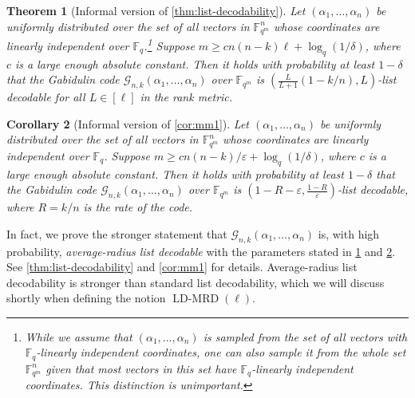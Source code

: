 \documentclass[11pt]{article}
\theoremstyle{plain}
\newtheorem{thm}{Theorem}[section]
\newtheorem{cor}[thm]{Corollary}
\theoremstyle{definition}
\theoremstyle{remark}
\newcommand{\F}{\mathbb{F}}
\newcommand{\eps}{\varepsilon}
\renewcommand{\epsilon}{\varepsilon}
\def \mG {\mathcal{G}}
\begin{document}
\begin{thm}[Informal version of \cref{thm:list-decodability}]\label{mm1}
Let $(\alpha_1,\dots,\alpha_n)$ be uniformly distributed over the set of all vectors in $\F_{q^m}^n$ whose coordinates are linearly independent over $\F_q$.\footnote{While we assume that $(\alpha_1,\dots,\alpha_n)$ is sampled from the set of all vectors with $\F_q$-linearly independent coordinates, one can also sample it from the whole set $\F_{q^m}^n$ given that most vectors in this set have $\F_q$-linearly independent coordinates. This distinction is unimportant.}
Suppose $m\geq cn(n-k)\ell+\log_q(1/\delta)$, where $c$ is a large enough absolute constant.
Then it holds with probability at least $1-\delta$ that the Gabidulin code $\mG_{n,k}(\alpha_1,\dots, \alpha_n)$ over $\F_{q^m}$ is $\left(\frac{L}{L+1}\left(1-{k}/{n}\right), L\right)$-list decodable for all $L\in [\ell]$ in the rank metric.
\end{thm}
\begin{cor}[Informal version of \cref{cor:mm1}]\label{mm2}
Let $(\alpha_1,\dots,\alpha_n)$ be uniformly distributed over the set of all vectors in $\F_{q^m}^n$ whose coordinates are linearly independent over $\F_q$. 
Suppose $m\geq cn(n-k)/\eps+\log_q(1/\delta)$, where $c$ is a large enough absolute constant.
Then it holds with probability at least $1-\delta$ that the Gabidulin code $\mG_{n,k}(\alpha_1,\dots, \alpha_n)$ over $\F_{q^m}$ is $\left(1-R-\epsilon,\frac{1-R}{\epsilon}\right)$-list decodable, where $R=k/n$ is the rate of the code. 
\end{cor}

In fact, we prove the stronger statement that $\mG_{n,k}(\alpha_1,\dots, \alpha_n)$ is, with high probability, \emph{average-radius list decodable} with the parameters stated in \cref{mm1} and \cref{mm2}. See \cref{thm:list-decodability} and \cref{cor:mm1} for details. Average-radius list decodability is stronger than standard list decodability, which we will discuss shortly when defining the notion $\operatorname{LD-MRD}(\ell)$.
\end{document}
